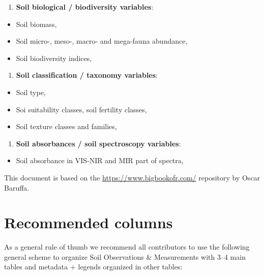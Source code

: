 \documentclass[
  graybox,natbib,nospthms]{svmono}
\providecommand{\tightlist}{%
  \setlength{\itemsep}{0pt}\setlength{\parskip}{0pt}}
\providecommand{\tightlist}{\setlength{\itemsep}{0pt}\setlength{\parskip}{0pt}}
\begin{document}
\begin{enumerate}
\def\labelenumi{\arabic{enumi}.}
\setcounter{enumi}{2}
\tightlist
\item
  \textbf{Soil biological / biodiversity variables}:
\end{enumerate}

\begin{itemize}
\tightlist
\item
  Soil biomass,
\item
  Soil micro-, meso-, macro- and mega-fauna abundance,
\item
  Soil biodiversity indices,
\end{itemize}

\begin{enumerate}
\def\labelenumi{\arabic{enumi}.}
\setcounter{enumi}{3}
\tightlist
\item
  \textbf{Soil classification / taxonomy variables}:
\end{enumerate}

\begin{itemize}
\tightlist
\item
  Soil type,
\item
  Soi suitability classes, soil fertility classes,
\item
  Soil texture classes and families,
\end{itemize}

\begin{enumerate}
\def\labelenumi{\arabic{enumi}.}
\setcounter{enumi}{4}
\tightlist
\item
  \textbf{Soil absorbances / soil spectroscopy variables}:
\end{enumerate}

\begin{itemize}
\tightlist
\item
  Soil absorbance in VIS-NIR and MIR part of spectra,
\end{itemize}

This document is based on the \url{https://www.bigbookofr.com/} repository
by Oscar Baruffa.

\hypertarget{recommended-columns}{%
\section{Recommended columns}\label{recommended-columns}}

As a general rule of thumb we recommend all contributors to use the following
general scheme to organize Soil Observations \& Measurements with 3--4 main tables
and metadata + legends organized in other tables:
\end{document}
